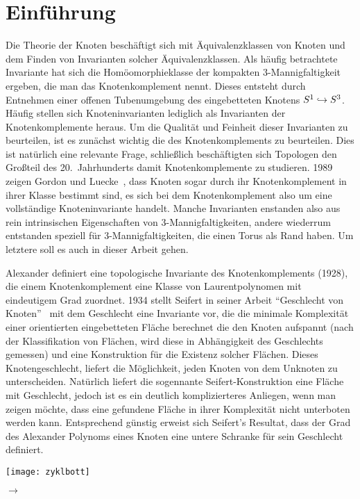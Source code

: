 \section{Einführung}
		
	\begin{minipage}[t][\textheight][t]{0.76\textwidth}

	Die Theorie der Knoten beschäftigt sich mit Äquivalenzklassen von Knoten und dem Finden von Invarianten solcher Äquivalenzklassen. Als häufig betrachtete Invariante hat sich die Homöomorphieklasse der kompakten 3-Mannigfaltigkeit ergeben, die man das Knotenkomplement nennt. Dieses entsteht durch Entnehmen einer offenen Tubenumgebung des eingebetteten Knotens $S^1 \hookrightarrow S^3$. Häufig stellen sich Knoteninvarianten lediglich als Invarianten der Knotenkomplemente heraus. Um die Qualität und Feinheit dieser Invarianten zu beurteilen, ist es zunächst wichtig die des Knotenkomplements zu beurteilen. Dies ist natürlich eine relevante Frage, schließlich beschäftigten sich Topologen den Großteil des 20.~Jahrhunderts damit Knotenkomplemente zu studieren. 1989 zeigen Gordon und Luecke~\cite{Gordon.1989}, dass Knoten sogar durch ihr Knotenkomplement in ihrer Klasse bestimmt sind, es sich bei dem Knotenkomplement also um eine vollständige Knoteninvariante handelt. Manche Invarianten enstanden also aus rein intrinsischen Eigenschaften von 3-Mannigfaltigkeiten, andere wiederrum entstanden speziell für 3-Mannigfaltigkeiten, die einen Torus als Rand haben. Um letztere soll es auch in dieser Arbeit gehen.

	Alexander definiert eine topologische Invariante des Knotenkomplements \cite{Alexander.1928} (1928), die einem Knotenkomplement eine Klasse von Laurentpolynomen mit eindeutigem Grad zuordnet.  1934 stellt Seifert in seiner Arbeit "`Geschlecht von Knoten"'~\cite{Seifert.1934} mit dem Geschlecht eine Invariante vor, die die minimale Komplexität einer orientierten eingebetteten Fläche berechnet die den Knoten aufspannt (nach der Klassifikation von Flächen, wird diese in Abhängigkeit des Geschlechts gemessen) und eine Konstruktion für die Existenz solcher Flächen. Dieses Knotengeschlecht, liefert die Möglichkeit, jeden Knoten von dem Unknoten zu unterscheiden. Natürlich liefert die sogennante Seifert-Konstruktion eine Fläche mit Geschlecht, jedoch ist es ein deutlich komplizierteres Anliegen, wenn man zeigen möchte, dass eine gefundene Fläche in ihrer Komplexität nicht unterboten werden kann. Entsprechend günstig erweist sich Seifert's Resultat, dass der Grad des Alexander Polynoms eines Knoten eine untere Schranke für sein Geschlecht definiert. 


	\vfill
	\begin{minipage}[t]{0.7\textwidth}
		\texttt{[image: zyklbott]} 
	\end{minipage}
	\begin{minipage}[t]{0.2\textwidth}
	\vspace{-1cm}
	\huge$\longrightarrow$
	\vfill

	\end{minipage}
	\vspace{.63cm}
		 \label{fig:zykl}
	\end{minipage}
